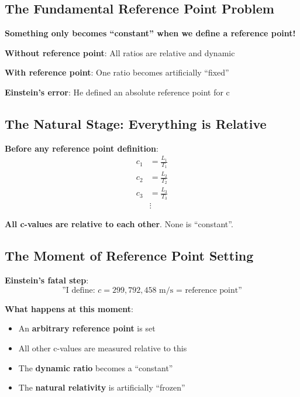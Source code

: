 	\subsection{The Fundamental Reference Point Problem}
	
	\begin{tcolorbox}[colback=red!5!white,colframe=red!75!black,title=The Reference Point Illusion]
		\textbf{Something only becomes ``constant'' when we define a reference point!}
		
		\textbf{Without reference point}: All ratios are relative and dynamic
		
		\textbf{With reference point}: One ratio becomes artificially ``fixed''
		
		\textbf{Einstein's error}: He defined an absolute reference point for c
	\end{tcolorbox}
	
	\subsection{The Natural Stage: Everything is Relative}
	
	\textbf{Before any reference point definition}:
	\begin{align}
		c_1 &= \frac{L_1}{T_1} \\
		c_2 &= \frac{L_2}{T_2} \\
		c_3 &= \frac{L_3}{T_3} \\
		&\vdots
	\end{align}
	
	\textbf{All c-values are relative to each other}. None is ``constant''.
	
	\subsection{The Moment of Reference Point Setting}
	
	\textbf{Einstein's fatal step}:
	\begin{equation}
		\text{''I define: } c = 299,792,458 \text{ m/s = reference point''}
	\end{equation}
	
	\textbf{What happens at this moment}:
	\begin{itemize}
		\item An \textbf{arbitrary reference point} is set
		\item All other c-values are measured relative to this
		\item The \textbf{dynamic ratio} becomes a ``constant''
		\item The \textbf{natural relativity} is artificially ``frozen''
	\end{itemize}
	
